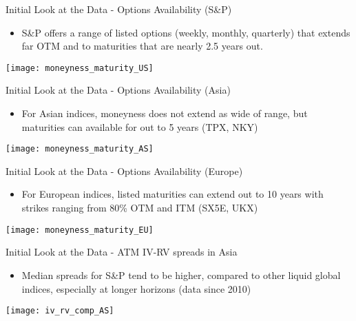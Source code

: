 \documentclass{beamer}
\begin{document}
\begin{frame}{Initial Look at the Data - Options Availability (S\&P)}


\begin{itemize}
\item S\&P offers a range of listed options (weekly, monthly, quarterly) that extends far OTM and to maturities that are nearly 2.5 years out.
\end{itemize}

\texttt{[image: moneyness\_maturity\_US]}

\end{frame}


\begin{frame}{Initial Look at the Data - Options Availability (Asia)}


\begin{itemize}
\item For Asian indices, moneyness does not extend as wide of range, but maturities can available for out to 5 years (TPX, NKY)
\end{itemize}

\texttt{[image: moneyness\_maturity\_AS]}

\end{frame}

\begin{frame}{Initial Look at the Data - Options Availability (Europe)}


\begin{itemize}
\item For European indices, listed maturities can extend out to 10 years with strikes ranging from 80\% OTM and ITM (SX5E, UKX)
\end{itemize}

\texttt{[image: moneyness\_maturity\_EU]}

\end{frame}

\begin{frame}{Initial Look at the Data - ATM IV-RV spreads in Asia}


\begin{itemize}
\item Median spreads for S\&P tend to be higher, compared to other liquid global indices, especially at longer horizons (data since 2010)
\end{itemize}


\texttt{[image: iv\_rv\_comp\_AS]}

\end{frame}
\end{document}
